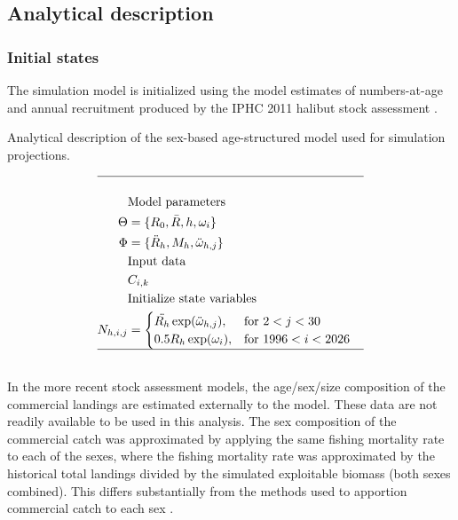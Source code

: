 \subsection{Analytical description} %
\label{sub:analytical_description}

\subsubsection{Initial states} %
\label{ssub:initial_states}
The simulation model is initialized using the model estimates of numbers-at-age and annual recruitment produced by the IPHC 2011 halibut stock assessment \citep{clark}.  

\begin{table}
	\caption{Analytical description of the sex-based age-structured model used for simulation projections.}
	\label{tab:model_description}
	\begin{center}
		\tableEq
		\begin{align}
			\hline \nonumber\\
			&\mbox{Model parameters} \nonumber\\
			\Theta &= \{R_0,\bar{R},h,\omega_{i}\} \\
			\Phi   &= \{\ddot{R}_h,M_h,\ddot{\omega}_{h,j}\} \\
			&\mbox{Input data} \nonumber\\
			&C_{i,k}\\
			&\mbox{Initialize state variables }\nonumber\\
			N_{h,i,j} &= 
			\begin{cases}
				\ddot{R_h}\exp(\ddot{\omega}_{h,j}), & \mbox{for $2<j<30$}\\
				0.5 R_h\exp(\omega_{i}), & \mbox{for $1996<i<2026$}\\
			\end{cases}\\
			\hline \nonumber
		\end{align}
		\normalEq
	\end{center}
\end{table}


In the more recent stock assessment models, the age/sex/size composition of the commercial landings are estimated externally to the model.  These data are not readily available to be used in this analysis.  The sex composition of the commercial catch was approximated by applying the same fishing mortality rate to each of the sexes, where the fishing mortality rate was approximated by the historical total landings divided by the simulated exploitable biomass (both sexes combined).  This differs substantially from the methods used to apportion commercial catch to each sex \cite[see][for details]{clark2004method}.


